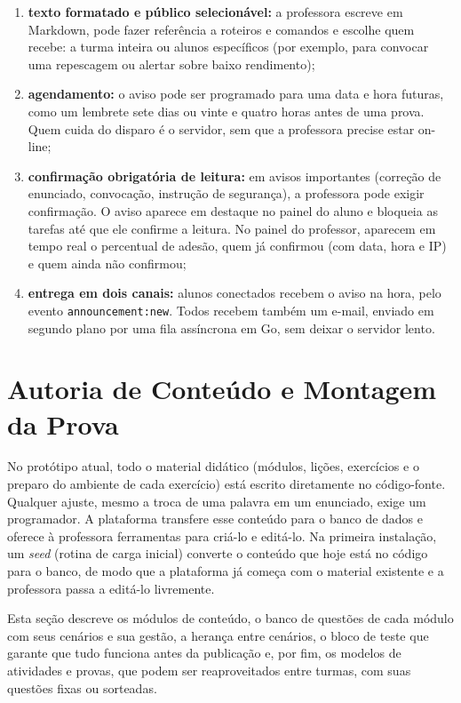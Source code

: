\begin{enumerate}
    \item \textbf{texto formatado e público selecionável:} a professora escreve em Markdown, pode fazer referência a roteiros e comandos e escolhe quem recebe: a turma inteira ou alunos específicos (por exemplo, para convocar uma repescagem ou alertar sobre baixo rendimento);
    \item \textbf{agendamento:} o aviso pode ser programado para uma data e hora futuras, como um lembrete sete dias ou vinte e quatro horas antes de uma prova. Quem cuida do disparo é o servidor, sem que a professora precise estar on-line;
    \item \textbf{confirmação obrigatória de leitura:} em avisos importantes (correção de enunciado, convocação, instrução de segurança), a professora pode exigir confirmação. O aviso aparece em destaque no painel do aluno e bloqueia as tarefas até que ele confirme a leitura. No painel do professor, aparecem em tempo real o percentual de adesão, quem já confirmou (com data, hora e IP) e quem ainda não confirmou;
    \item \textbf{entrega em dois canais:} alunos conectados recebem o aviso na hora, pelo evento \texttt{announcement:new}. Todos recebem também um e-mail, enviado em segundo plano por uma fila assíncrona em Go, sem deixar o servidor lento.
\end{enumerate}

\section{Autoria de Conteúdo e Montagem da Prova}
\label{sec:autoria-conteudo}

No protótipo atual, todo o material didático (módulos, lições, exercícios e o preparo do ambiente de cada exercício) está escrito diretamente no código-fonte. Qualquer ajuste, mesmo a troca de uma palavra em um enunciado, exige um programador. A plataforma transfere esse conteúdo para o banco de dados e oferece à professora ferramentas para criá-lo e editá-lo. Na primeira instalação, um \textit{seed} (rotina de carga inicial) converte o conteúdo que hoje está no código para o banco, de modo que a plataforma já começa com o material existente e a professora passa a editá-lo livremente.

Esta seção descreve os módulos de conteúdo, o banco de questões de cada módulo com seus cenários e sua gestão, a herança entre cenários, o bloco de teste que garante que tudo funciona antes da publicação e, por fim, os modelos de atividades e provas, que podem ser reaproveitados entre turmas, com suas questões fixas ou sorteadas.

